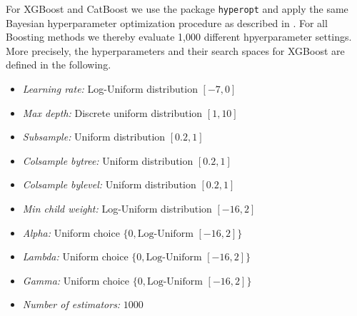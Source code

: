 \documentclass{article}
\theoremstyle{plain}
\theoremstyle{definition}
\theoremstyle{remark}
\begin{document}
For XGBoost and CatBoost we use the package  \texttt{hyperopt}
and apply the same Bayesian hyperparameter optimization procedure
as described in \cite{ShwartzZiv:21}. For all Boosting methods we 
thereby evaluate 1,000 different hpyerparameter settings. More precisely,
the hyperparameters and their search spaces for XGBoost are defined in the following.
\begin{itemize}
    \item \textit{Learning rate:} Log-Uniform distribution $[-7, 0]$
    \item \textit{Max depth:} Discrete uniform distribution $[1, 10]$
    \item \textit{Subsample:} Uniform distribution $[0.2, 1]$
    \item \textit{Colsample bytree:} Uniform distribution $[0.2, 1]$
    \item \textit{Colsample bylevel:} Uniform distribution $[0.2, 1]$
    \item \textit{Min child weight:} Log-Uniform distribution $[-16, 2]$
    \item \textit{Alpha:} Uniform choice $\{0, \text{Log-Uniform }[-16, 2] \}$
    \item \textit{Lambda:} Uniform choice $\{0, \text{Log-Uniform }[-16, 2] \}$
    \item \textit{Gamma:} Uniform choice $\{0, \text{Log-Uniform }[-16, 2] \}$
    \item \textit{Number of estimators:} $1000$
\end{itemize}
\end{document}

